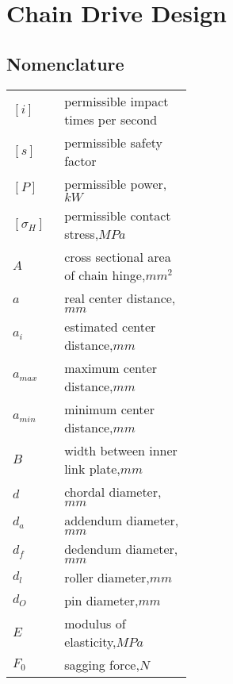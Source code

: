 \chapter{Chain Drive Design}
\section{Nomenclature}
\begin{tabular}[t]{p{0.05\linewidth}p{0.4\linewidth}}
	$ [i] $ & permissible impact times per second\\
	$ [s] $ & permissible safety factor\\
	$ [P] $ & permissible power,$ \unit{kW} $\\
	$ [\sigma_H] $ & permissible contact stress,$ \unit{MPa} $\\
	$ A $ & cross sectional area of chain hinge,$ \unit{mm^2} $\\
	$ a $ & real center distance,$ \unit{mm} $\\
	$ a_i $ & estimated center distance,$ \unit{mm} $\\
	$ a_{max} $ & maximum center distance,$ \unit{mm} $\\
	$ a_{min} $ & minimum center distance,$ \unit{mm} $\\
	$ B $ & width between inner link plate,$ \unit{mm} $\\
	$ d $ & chordal diameter,$ \unit{mm} $\\
	$ d_a $ & addendum diameter,$ \unit{mm} $\\
	$ d_f $ & dedendum diameter,$ \unit{mm} $\\
	$ d_l $ & roller diameter,$ \unit{mm} $\\
	$ d_O $ & pin diameter,$ \unit{mm} $\\
	$ E $ & modulus of elasticity,$ \unit{MPa} $\\
	$ F_0 $ & sagging force,$ \unit{N} $\\
\end{tabular}%
